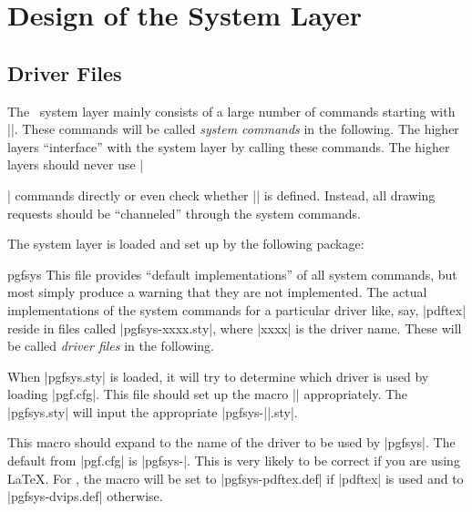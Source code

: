 %
%
%


\section{Design of the System Layer}

\makeatletter

\subsection{Driver Files}
\label{section-pgfsys}

The \pgfname\ system layer mainly consists of a large number of commands
starting with |\pgfsys@|. These commands will be called \emph{system commands}
in the following. The higher layers ``interface'' with the system layer by
calling these commands. The higher layers should never use |\special| commands
directly or even check whether |\pdfoutput| is defined. Instead, all drawing
requests should be ``channeled'' through the system commands.

The system layer is loaded and set up by the following package:

\begin{package}{pgfsys}
    This file provides ``default implementations'' of all system commands, but
    most simply produce a warning that they are not implemented. The actual
    implementations of the system commands for a particular driver like, say,
    |pdftex| reside in files called |pgfsys-xxxx.sty|, where |xxxx| is the
    driver name. These will be called \emph{driver files} in the following.

    When |pgfsys.sty| is loaded, it will try to determine which driver is used
    by loading |pgf.cfg|. This file should set up the macro |\pgfsysdriver|
    appropriately. The |pgfsys.sty| will input the appropriate
    |pgfsys-||.sty|.
\end{package}

\begin{command}{\pgfsysdriver}
    This macro should expand to the name of the driver to be used by |pgfsys|.
    The default from |pgf.cfg| is |pgfsys-\Gin@driver|. This is very likely to
    be correct if you are using \LaTeX. For , the macro will be set
    to |pgfsys-pdftex.def| if |pdftex| is used and to |pgfsys-dvips.def|
    otherwise.
\end{command}

